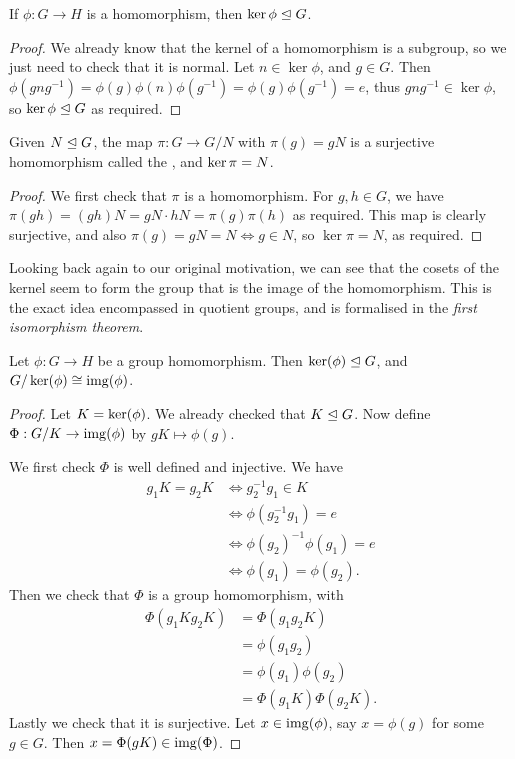\documentclass[a4paper]{scrartcl}
\begin{document}
\begin{theorem}
	If $\phi: G \rightarrow H$ is a homomorphism, then $\ker \phi \trianglelefteq G$.
\end{theorem}
\begin{proof}
	We already know that the kernel of a homomorphism is a subgroup, so we just need to check that it is normal. Let $n \in \ker \phi$, and $g \in G$. Then $\phi(gng^{-1}) = \phi(g) \phi(n)\phi(g^{-1}) = \phi(g) \phi(g^{-1}) = e$, thus $gng^{-1} \in \ker \phi$, so $\ker \phi \trianglelefteq G$ as required.
\end{proof}

\begin{theorem}
	Given $N \trianglelefteq G$, the map $\pi: G \rightarrow G/N$ with $\pi(g) = gN$ is a surjective homomorphism called the , and $\operatorname{ker} \pi = N$.
\end{theorem}
\begin{proof}
We first check that $\pi$ is a homomorphism. For $g, h \in G$, we have $\pi(gh) = (gh)N = gN \cdot hN = \pi(g) \pi(h)$ as required. This map is clearly surjective, and also $\pi(g) = gN = N \iff g \in N$, so $\ker \pi = N$, as required.
\end{proof}


Looking back again to our original motivation, we can see that the cosets of the kernel seem to form the group that is the image of the homomorphism. This is the exact idea encompassed in quotient groups, and is formalised in the \emph{first isomorphism theorem}.

\begin{theorem}
	Let $\phi: G \rightarrow H$ be a group homomorphism. Then $\operatorname{ker}(\phi) \trianglelefteq G$, and $G/\operatorname{ker}(\phi) \cong \operatorname{img}(\phi)$.
\end{theorem}
\begin{proof}
	Let $K = \operatorname{ker}(\phi)$. We already checked that $K \trianglelefteq G$. Now define $\Phi: G/K \rightarrow \operatorname{img}(\phi)$ by $gK \mapsto \phi(g)$.

	We first check $\Phi$ is well defined and injective. We have
	\begin{align*}
		g_1K = g_2K &\iff g_2^{-1} g_1 \in K \\
		&\iff \phi(g_2^{-1}g_1) = e \\
		&\iff \phi(g_2)^{-1} \phi(g_1) = e  \\
		&\iff \phi(g_1) = \phi(g_2).
	\end{align*}
	Then we check that $\Phi$ is a group homomorphism, with
	\begin{align*}
		\Phi(g_1 K g_2 K) &= \Phi(g_1 g_2 K) \\
			&= \phi(g_1 g_2) \\
			&= \phi(g_1) \phi(g_2) \\
			&= \Phi(g_1 K) \Phi(g_2 K).
	\end{align*}
	Lastly we check that it is surjective. Let $x \in \operatorname{img}(\phi)$, say $x = \phi(g)$ for some $g \in G$. Then $x = \Phi(gK) \in \operatorname{img}(\Phi)$.
\end{proof}
\end{document}

